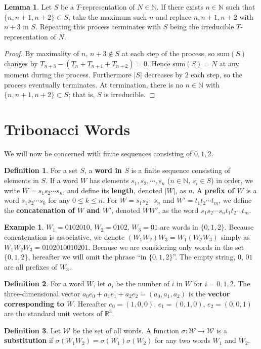 \documentclass{article}
\theoremstyle{definition}
\newtheorem{lemma}[theorem]{Lemma}
\newtheorem*{definition}{Definition}
\newtheorem*{example}{Example}
\begin{document}
\begin{lemma}
\label{thm 2}
Let \( S \) be a \( T \)-representation of \( N \in \mathbb{N} \).  
If there exists \( n \in \mathbb{N} \) such that \( \{n, n+1, n+2\} \subset S \), take the maximum such $n$ and replace $ n, n+1, n+2  $ with \( n+3 \) in \( S \).  
Repeating this process terminates with \( S \) being the irreducible \( T \)-representation of \( N \).
\end{lemma}

\begin{proof}
By maximality of $n$, $n+3\notin S$ at each step of the process, so $\text{sum}(S)$ changes by $T_{n+3}-(T_n+T_{n+1}+T_{n+2})=0$. Hence $\text{sum}(S)=N$ at any moment during the process. Furthermore $|S|$ decreases by $2$ each step, so the process eventually terminates. At termination, there is no $n\in\mathbb{N}$ with $\{n,n+1,n+2\}\subset S$; that is, $S$ is irreducible.
\end{proof}

\section{Tribonacci Words}
\label{sec2}

We will now be concerned with finite sequences consisting of $0, 1, 2$.
\begin{definition}
For a set $S$, a \textbf{word in $S$} is a finite sequence consisting of elements in $S$. If a word $W$ has elements $s_1, s_2, \cdots, s_n$ ($n\in \mathbb{N}$, $s_i\in S$) in order, we write  $W=s_1s_2\cdots s_n$, and define its \textbf{length}, denoted $|W|$, as $n$. A \textbf{prefix of $W$} is a word $s_1s_2\cdots s_k$ for any $0\leq k\leq n$. For $W=s_1s_2\cdots s_n$ and $W'=t_1t_2\cdots t_m$, we define the \textbf{concatenation of $W$ and $W'$}, denoted $WW'$, as the word $s_1s_2\cdots s_nt_1t_2\cdots t_m$.
\end{definition}

\begin{example}
$W_1=0102010$, $W_2=0102$, $W_3=01$ are words in $\{0,1,2\}$. Because concatenation is associative, we denote $(W_1W_2)W_3=W_1(W_2W_3)$ simply as $W_1W_2W_3=0102010010201$. Because we are considering only words in the set $\{0,1,2\}$, hereafter we will omit the phrase ``in $\{0,1,2\}$''. The empty string, $0$, $01$ are all prefixes of $W_3$.
\end{example}

\begin{definition}
For a word $W$, let $a_i$ be the number of $i$ in $W$ for $i=0,1,2$. The three-dimensional vector $a_0e_0+a_1e_1+a_2e_2=(a_0, a_1, a_2)$ is the \textbf{vector corresponding to $W$}. Hereafter $e_0=(1,0,0)$, $e_1=(0,1,0)$, $e_2=(0,0,1)$ are the standard unit vectors of $\mathbb{R}^3$.
\end{definition}
\begin{definition}
Let $\mathcal{W}$ be the set of all words. A function $\sigma: \mathcal{W}\rightarrow \mathcal{W}$ is a \textbf{substitution} if $\sigma(W_1W_2)=\sigma(W_1)\sigma(W_2)$ for any two words $W_1$ and $W_2$.
\end{definition}
\end{document}
